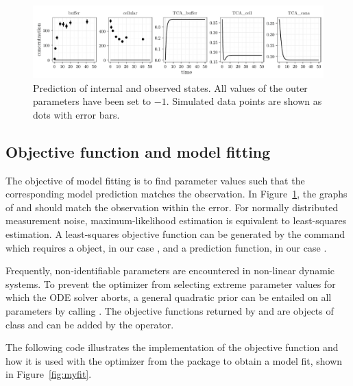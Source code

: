 \documentclass[article]{jss}
\begin{document}
\begin{figure}[ht]
	\centering
	\includegraphics[width = \textwidth]{images/figure3}
	\caption{Prediction of internal and observed states. All values of the outer parameters have been set to $-1$. Simulated data points are shown as dots with error bars.}
	\label{fig:gxp}
\end{figure}

\subsection{Objective function and model fitting}
The objective of model fitting is to find parameter values such that the corresponding model prediction matches the observation. In Figure~\ref{fig:gxp}, the graphs of  and  should match the observation within the error.
For normally distributed measurement noise, maxi\-mum-likelihood estimation is equivalent to least-squares estimation. A least-squares objective function can be generated by the  command which requires a  object, in our case , and a prediction function, in our case .

Frequently, non-identifiable parameters are encountered in non-linear dynamic systems. To prevent the optimizer from selecting extreme parameter values for which the ODE solver aborts, a general quadratic prior can be entailed on all parameters by calling . The objective functions returned by  and  are objects of class  and can be added by the  operator.

The following code illustrates the implementation of the objective function and how it is used with the  optimizer from the  package to obtain a model fit, shown in Figure~\ref{fig:myfit}.

\begin{CodeChunk}
\end{CodeChunk}
\end{document}
